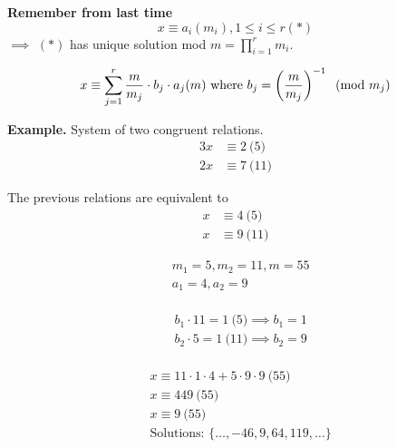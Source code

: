 

\textbf{Remember from last time}
\[
  x \equiv a_i (m_i), 1 \leq i \leq r (*)
\]
$\implies$ $(*)$ has unique solution mod $\displaystyle{m = \prod_{i = 1}^r m_i}$.

\[
  x \equiv \sum_{j=1}^r \frac {m}{m_j} \cdot b_j \cdot a_j (m) \text{ where }
  b_j = \left( \frac{m}{m_j} \right) ^{-1} \imod{m_j}
\]

\textbf{Example.}
System of two congruent relations.
\begin{align*}
  3x &\equiv 2 \pod{5} \\
  2x &\equiv 7 \pod{11}
\end{align*}

The previous relations are equivalent to
\begin{align*}
  x &\equiv 4 \pod{5} \\
  x &\equiv 9 \pod{11}
\end{align*}
\begin{minipage}[t]{0.5\textwidth}
\begin{align*}
  &m_1 = 5, m_2 = 11, m = 55 \\
  &a_1 = 4, a_2 = 9 \\
\end{align*}
\end{minipage}
\begin{minipage}[t]{0.5\textwidth}
\begin{align*}
  &b_1 \cdot 11 = 1 \pod{5}  \implies b_1 = 1 \\
  &b_2 \cdot 5 = 1  \pod{11} \implies b_2 = 9 \\
\end{align*}
\end{minipage}
\begin{align*}
  & x \equiv 11 \cdot 1 \cdot 4 + 5 \cdot9 \cdot9 \pod{55}\\
  & x \equiv 449 \pod{55} \\
  & x \equiv 9 \pod{55} \\
  & \text{Solutions: } \{\dots, -46, 9, 64, 119, \dots \}
\end{align*}

